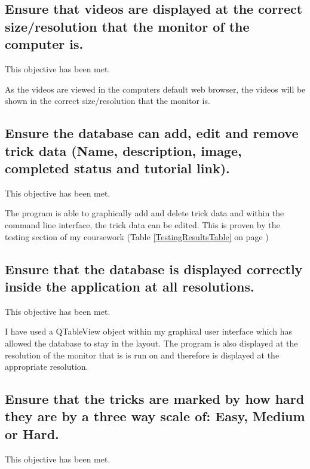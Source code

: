 \subsection {Ensure that videos are displayed at the correct size/resolution that the monitor of the computer is.}

This objective has been met.

As the videos are viewed in the computers default web browser, the videos will be shown in the correct size/resolution that the monitor is.



\subsection {Ensure the database can add, edit and remove trick data (Name, description, image, completed status and tutorial link).}

This objective has been met.

The program is able to graphically add and delete trick data and within the command line interface, the trick data can be edited. This is proven by the testing section of my coursework (Table \ref{TestingResultsTable} on page \pageref{TestingResultsTable})

\subsection {Ensure that the database is displayed correctly inside the application at all resolutions.}

This objective has been met.

I have used a QTableView object within my graphical user interface which has allowed the database to stay in the layout. The program is also displayed at the resolution of the monitor that is is run on and therefore is displayed at the appropriate resolution.

\subsection {Ensure that the tricks are marked by how hard they are by a three way scale of: Easy, Medium or Hard.}

This objective has been met.

